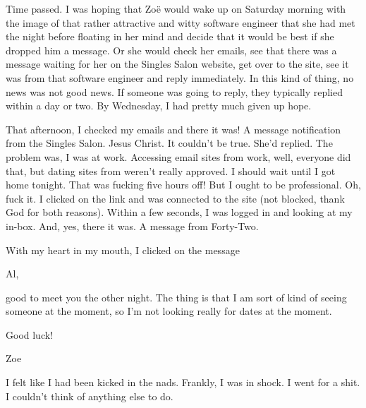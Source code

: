 Time passed. I was hoping that Zoë would wake up on Saturday
morning with the image of that rather attractive and witty software
engineer that she had met the night before floating in her mind and
decide that it would be best if she dropped him a message. Or she
would check her emails, see that there was a message waiting for her
on the Singles Salon website, get over to the site, see it was from
that software engineer and reply immediately. In this kind of thing,
no news was not good news. If someone was going to reply, they
typically replied within a day or two. By Wednesday, I had pretty
much given up hope.

That afternoon, I checked my emails and there it was! A message
notification from the Singles Salon. Jesus Christ. It couldn't be
true. She'd replied. The problem was, I was at work. Accessing email
sites from work, well, everyone did that, but dating sites from
weren't really approved. I should wait until I got home tonight.
That was fucking five hours off! But I ought to be professional. Oh,
fuck it. I clicked on the link and was connected to the site (not
blocked, thank God for both reasons). Within a few seconds, I was
logged in and looking at my in-box. And, yes, there it was. A
message from Forty-Two.

With my heart in my mouth, I clicked on the message

\startmessage
Al,

good to meet you the other night. The thing is that I am sort of
kind of seeing someone at the moment, so I'm not looking really for
dates at the moment.

Good luck!

Zoe
\stopmessage

I felt like I had been kicked in the nads. Frankly, I was in shock.
I went for a shit. I couldn't think of anything else to do.

